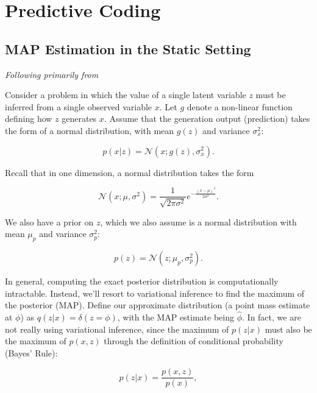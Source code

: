 \chapter{Predictive Coding}

\section{MAP Estimation in the Static Setting}

\textit{Following primarily from \cite{bogacz2017tutorial}}
\newline

Consider a problem in which the value of a single latent variable $z$ must be inferred from a single observed variable $x$. Let $g$ denote a non-linear function defining how $z$ generates $x$. Assume that the generation output (prediction) takes the form of a normal distribution, with mean $g(z)$ and variance $\sigma^2_x$:

\begin{equation}
	p (x | z) = \mathcal{N} (x; g(z), \sigma^2_x).
\end{equation}

\noindent Recall that in one dimension, a normal distribution takes the form

\begin{equation}
	\mathcal{N} (x; \mu, \sigma^2) = \frac{1}{\sqrt{2 \pi \sigma^2}} e^{-\frac{(x - \mu)^2}{2 \sigma^2}}.
\end{equation}

\noindent We also have a prior on $z$, which we also assume is a normal distribution with mean $\mu_p$ and variance $\sigma^2_p$:

\begin{equation}
	p (z) = \mathcal{N} (z; \mu_p, \sigma^2_p).
\end{equation}

In general, computing the exact posterior distribution is computationally intractable. Instead, we'll resort to variational inference to find the maximum of the posterior (MAP). Define our approximate distribution (a point mass estimate at $\phi$) as $q(z|x) = \delta (z = \phi)$, with the MAP estimate being $\hat{\phi}$. In fact, we are not really using variational inference, since the maximum of $p(z | x)$ must also be the maximum of $p(x, z)$ through the definition of conditional probability (Bayes' Rule):

\begin{equation}
p(z|x) = \frac{p(x, z)}{p(x)},
\end{equation}


